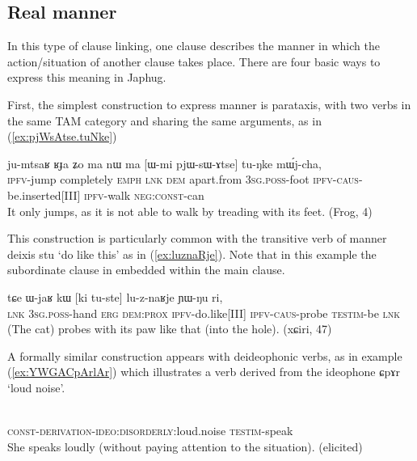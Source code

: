 \documentclass[oldfontcommands,oneside,a4paper,11pt]{article}
\newcommand{\ipa}[1]{{\phon \mbox{#1}}} %
\newcommand{\refb}[1]{(\ref{#1})}
\begin{document}
\subsection{Real manner}
In this type of clause linking, one clause describes the manner in which the action/situation of another clause takes place. There are four basic ways to express this meaning in Japhug.

First, the simplest construction to express manner is  parataxis, with    two verbs  in the same TAM category and sharing the same arguments, as in \refb{ex:pjWsAtse.tuNke}

\begin{exe}
\ex \label{ex:pjWsAtse.tuNke}
\gll
\ipa{ju-mtsaʁ} 	\ipa{ʁɟa} 	\ipa{ʑo} 	\ipa{ma} 	\ipa{nɯ} 	\ipa{ma} 	[\ipa{ɯ-mi} 	\ipa{pjɯ-sɯ-ɤtse}] 	\ipa{tu-ŋke} 	\ipa{mɯ́j-cha,} \\
\textsc{ipfv}-jump completely \textsc{emph} \textsc{lnk} \textsc{dem} apart.from \textsc{3sg.poss}-foot \textsc{ipfv-caus}-be.inserted[III] \textsc{ipfv}-walk \textsc{neg:const}-can \\
\glt It only jumps, as it is not able to walk by treading with its feet.  (Frog, 4)
\end{exe}

This construction is particularly common with the transitive verb of manner deixis \ipa{stu} `do like this' as in \refb{ex:luznaRje}. Note that in this example the subordinate clause in embedded within the main clause.

\begin{exe}
\ex \label{ex:luznaRje}
\gll
\ipa{tɕe} 	\ipa{ɯ-jaʁ} 	\ipa{kɯ} 	[\ipa{ki} 	\ipa{tu-ste}] 	\ipa{lu-z-naʁje} 	\ipa{ɲɯ-ŋu} 	\ipa{ri,} \\
\textsc{lnk} \textsc{3sg.poss}-hand \textsc{erg} \textsc{dem:prox} \textsc{ipfv}-do.like[III] \textsc{ipfv-caus}-probe \textsc{testim}-be \textsc{lnk} \\
\glt (The cat) probes with its paw like that (into the hole). (xɕiri, 47)
\end{exe}
A formally similar construction appears with deideophonic verbs, as in example \refb{ex:YWGACpArlAr} which illustrates a   verb derived from the ideophone \ipa{ɕpɤr} `loud noise'.  

\begin{exe}
\ex \label{ex:YWGACpArlAr}
\gll
[\ipa{ɲɯ-ɣɤ-ɕpɤrlɤr}] 	\ipa{ɲɯ-rɯɕmi} \\
\textsc{const-derivation-ideo:disorderly:}loud.noise \textsc{testim}-speak\\
\glt She speaks loudly (without paying attention to the situation). (elicited)
\end{exe}
\end{document}

